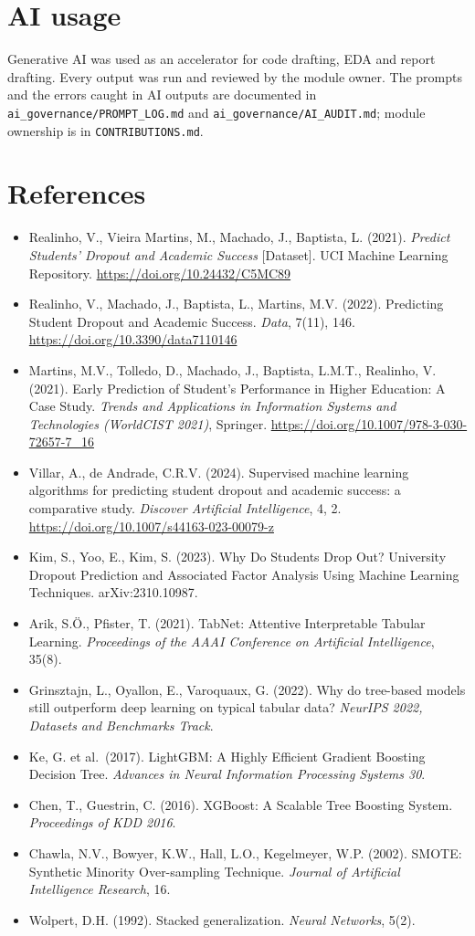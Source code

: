 \documentclass[11pt,a4paper]{article}
\begin{document}
\section{AI usage}
Generative AI was used as an accelerator for code drafting, EDA and report drafting. Every output was run and reviewed by the module owner. The prompts and the errors caught in AI outputs are documented in \texttt{ai\_governance/PROMPT\_LOG.md} and \texttt{ai\_governance/AI\_AUDIT.md}; module ownership is in \texttt{CONTRIBUTIONS.md}.

\section*{References}
\small
\begin{itemize}
\item Realinho, V., Vieira Martins, M., Machado, J., Baptista, L. (2021). \textit{Predict Students' Dropout and Academic Success} [Dataset]. UCI Machine Learning Repository. \url{https://doi.org/10.24432/C5MC89}
\item Realinho, V., Machado, J., Baptista, L., Martins, M.V. (2022). Predicting Student Dropout and Academic Success. \textit{Data}, 7(11), 146. \url{https://doi.org/10.3390/data7110146}
\item Martins, M.V., Tolledo, D., Machado, J., Baptista, L.M.T., Realinho, V. (2021). Early Prediction of Student's Performance in Higher Education: A Case Study. \textit{Trends and Applications in Information Systems and Technologies (WorldCIST 2021)}, Springer. \url{https://doi.org/10.1007/978-3-030-72657-7_16}
\item Villar, A., de Andrade, C.R.V. (2024). Supervised machine learning algorithms for predicting student dropout and academic success: a comparative study. \textit{Discover Artificial Intelligence}, 4, 2. \url{https://doi.org/10.1007/s44163-023-00079-z}
\item Kim, S., Yoo, E., Kim, S. (2023). Why Do Students Drop Out? University Dropout Prediction and Associated Factor Analysis Using Machine Learning Techniques. arXiv:2310.10987.
\item Arik, S.Ö., Pfister, T. (2021). TabNet: Attentive Interpretable Tabular Learning. \textit{Proceedings of the AAAI Conference on Artificial Intelligence}, 35(8).
\item Grinsztajn, L., Oyallon, E., Varoquaux, G. (2022). Why do tree-based models still outperform deep learning on typical tabular data? \textit{NeurIPS 2022, Datasets and Benchmarks Track}.
\item Ke, G. et al.\ (2017). LightGBM: A Highly Efficient Gradient Boosting Decision Tree. \textit{Advances in Neural Information Processing Systems 30}.
\item Chen, T., Guestrin, C. (2016). XGBoost: A Scalable Tree Boosting System. \textit{Proceedings of KDD 2016}.
\item Chawla, N.V., Bowyer, K.W., Hall, L.O., Kegelmeyer, W.P. (2002). SMOTE: Synthetic Minority Over-sampling Technique. \textit{Journal of Artificial Intelligence Research}, 16.
\item Wolpert, D.H. (1992). Stacked generalization. \textit{Neural Networks}, 5(2).
\end{itemize}
\end{document}
